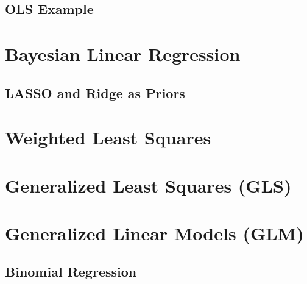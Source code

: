 \subsection{OLS Example}
\label{regression:linear:example}

\section{Bayesian Linear Regression}
\label{regression:bayesian_linear}

\subsection{LASSO and Ridge as Priors}
\label{regression:bayesian_linear:lasso_vs_ridge}

\section{Weighted Least Squares}
\label{regression:WLS}

\section{Generalized Least Squares (GLS)}
\label{regression:GLS}

\section{Generalized Linear Models (GLM)}
\label{regression:GLM}

\subsection{Binomial Regression}
\label{regression:GLM:binomial}


